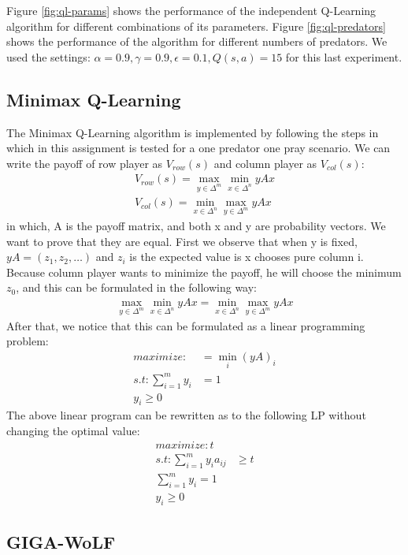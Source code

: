 \documentclass[a4paper,12pt]{article}
\begin{document}
Figure \ref{fig:ql-params} shows the performance of the independent Q-Learning algorithm for different combinations of its parameters. Figure \ref{fig:ql-predators} shows the performance of the algorithm for different numbers of predators. We used the settings: $\alpha = 0.9, \gamma = 0.9, \epsilon = 0.1, Q(s, a) = 15$ for this last experiment.

\subsection{Minimax Q-Learning}
The Minimax Q-Learning algorithm is implemented by following the steps in \cite{hk} which in this assignment is tested for a one predator one pray scenario. We can write the payoff of row player as $V_{row}(s)$ and column player as $V_{col}(s)$:
\begin{align}
 V_{row}(s) = \max_{y\in \Delta^m} \min_{x\in \Delta^n} yAx \\
 V_{col}(s) = \min_{x\in \Delta^n} \max_{y\in \Delta^m} yAx
\end{align}
in which, A is the payoff matrix, and both x and y are probability vectors. We want to prove that they are equal. First we observe that when y is fixed, $yA = (z_1,z_2, \dots)$ and $z_i$ is the expected value is x chooses pure column i. Because column player wants to minimize the payoff, he will choose the minimum $ z_0 $, and this can be formulated in the following way:
\begin{align}
\max_{y\in \Delta^m} \min_{x\in \Delta^n} yAx = \min_{x\in \Delta^n} \max_{y\in \Delta^m} yAx
\end{align}
After that, we notice that this can be formulated as a linear programming problem:
\begin{align}
maximize : &= \min_i (yA)_i \\
s.t : \sum_{i=1}^{m}y_i &= 1 \\
y_i \geq 0
\end{align}
The above linear program can be rewritten as to the following LP without changing the optimal value:
\begin{align}
maximize : t \\
s.t : \sum_{i=1}^{m}y_i a_{ij} &\geq t \\
\sum_{i=1}^{m}y_i = 1 \\
y_i \geq 0
\end{align}


\subsection{GIGA-WoLF}
\end{document}
